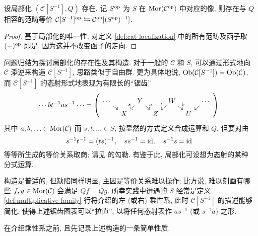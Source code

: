 \begin{proposition}
	设局部化 $(\mathcal{C}[S^{-1}], Q)$ 存在. 记 $S^{\operatorname{op}}$ 为 $S$ 在 $\operatorname{Mor}(\mathcal{C}^{\operatorname{op}})$ 中对应的像, 则存在与 $Q$ 相容的范畴等价 $\mathcal{C}[S^{-1}]^{\operatorname{op}} \leftrightarrows \mathcal{C}^{\operatorname{op}}[(S^{\operatorname{op}})^{-1}]$.
\end{proposition}
\begin{proof}
	基于局部化的唯一性, 对定义 \ref{def:cat-localization} 中的所有范畴及函子取 $(-)^{\operatorname{op}}$ 即是, 因为这并不改变函子的走向.
\end{proof}

问题归结为探讨局部化的存在性及其构造. 对于一般的 $\mathcal{C}$ 和 $S$, 可以通过形式地向 $\mathcal{C}$ 添逆来构造 $\mathcal{C}[S^{-1}]$, 思路类似于自由群. 更为具体地说, $\operatorname{Ob}(\mathcal{C}[S^{-1}]) = \operatorname{Ob}(\mathcal{C})$, 而 $\mathcal{C}[S^{-1}]$ 的态射形式地表现为有限长的``锯齿''
\[ \cdots b t^{-1} a s^{-1} \cdots = \left(
	\begin{tikzcd}[row sep=tiny, column sep=tiny]
	\cdots \arrow[rd] & & Y \arrow[ld, "s"'] \arrow[rd, "a"] & & W \arrow[ld, "t"'] \arrow[rd, "b"] & & \cdots \arrow[ld] \\
	& X & & Z & & U &
\end{tikzcd}\right) \]
其中 $a, b, \ldots \in \operatorname{Mor}(\mathcal{C})$ 而 $s, t, \ldots \in S$, 按显然的方式定义合成运算和 $Q$, 但要对由
\[ s^{-1} t^{-1} = (ts)^{-1}, \quad s s^{-1} = \mathrm{id}, \quad s^{-1} s = \mathrm{id} \]
等等所生成的等价关系取商; 请见 \cite[I.1.1]{GZ67} 的勾勒. 有鉴于此, 局部化可设想为态射的某种分式运算.

构造是普适的, 但缺陷同样明显, 主因是等价关系难以操作; 比方说, 难以刻画有哪些 $f, g \in \operatorname{Mor}(\mathcal{C})$ 会满足 $Qf = Qg$. 所幸实践中遭遇的 $S$ 经常是定义 \ref{def:multiplicative-family} 行将介绍的左 (或右) 乘性系, 此时 $\mathcal{C}[S^{-1}]$ 的描述能够简化, 使得上述锯齿图表可以``拉直'', 以将任何态射表作 $a s^{-1}$ (或 $s^{-1} a$) 之形.

在介绍乘性系之前, 且先记录上述构造的一条简单性质.

